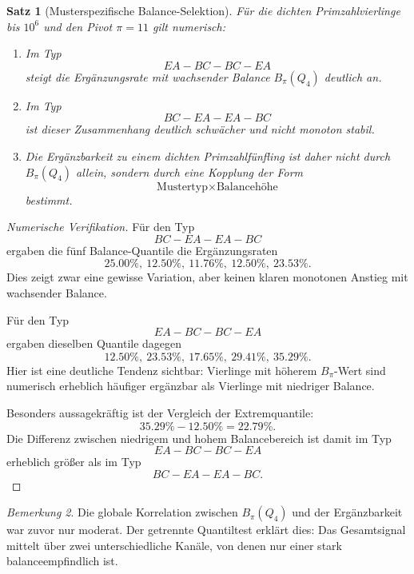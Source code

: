 \documentclass[11pt,a4paper]{article}
\newtheorem{satz}{Satz}
\theoremstyle{definition}
\theoremstyle{remark}
\newtheorem{bemerkung}[satz]{Bemerkung}
\begin{document}
	\begin{satz}[Musterspezifische Balance-Selektion]
		\label{satz:musterspezifische_balance_selektion}
		Für die dichten Primzahlvierlinge bis \(10^6\) und den Pivot \(\pi=11\) gilt numerisch:
		
		\begin{enumerate}
			\item Im Typ
			\[
			EA-BC-BC-EA
			\]
			steigt die Ergänzungsrate mit wachsender Balance \(B_\pi(Q_4)\) deutlich an.
			
			\item Im Typ
			\[
			BC-EA-EA-BC
			\]
			ist dieser Zusammenhang deutlich schwächer und nicht monoton stabil.
			
			\item Die Ergänzbarkeit zu einem dichten Primzahlfünfling ist daher nicht durch
			\(B_\pi(Q_4)\) allein, sondern durch eine Kopplung der Form
			\[
			\boxed{
				\text{Mustertyp} \times \text{Balancehöhe}
			}
			\]
			bestimmt.
		\end{enumerate}
	\end{satz}
	
	\begin{proof}[Numerische Verifikation]
		Für den Typ
		\[
		BC-EA-EA-BC
		\]
		ergaben die fünf Balance-Quantile die Ergänzungsraten
		\[
		25.00\%,\ 12.50\%,\ 11.76\%,\ 12.50\%,\ 23.53\%.
		\]
		Dies zeigt zwar eine gewisse Variation, aber keinen klaren monotonen Anstieg mit wachsender
		Balance.
		
		Für den Typ
		\[
		EA-BC-BC-EA
		\]
		ergaben dieselben Quantile dagegen
		\[
		12.50\%,\ 23.53\%,\ 17.65\%,\ 29.41\%,\ 35.29\%.
		\]
		Hier ist eine deutliche Tendenz sichtbar: Vierlinge mit höherem \(B_\pi\)-Wert sind
		numerisch erheblich häufiger ergänzbar als Vierlinge mit niedriger Balance.
		
		Besonders aussagekräftig ist der Vergleich der Extremquantile:
		\[
		35.29\%-12.50\%=22.79\%.
		\]
		Die Differenz zwischen niedrigem und hohem Balancebereich ist damit im Typ
		\[
		EA-BC-BC-EA
		\]
		erheblich größer als im Typ
		\[
		BC-EA-EA-BC.
		\]
	\end{proof}
	
	\begin{bemerkung}
		Die globale Korrelation zwischen \(B_\pi(Q_4)\) und der Ergänzbarkeit war zuvor nur
		moderat. Der getrennte Quantiltest erklärt dies: Das Gesamtsignal mittelt über zwei
		unterschiedliche Kanäle, von denen nur einer stark balanceempfindlich ist.
	\end{bemerkung}
	
\end{document}
